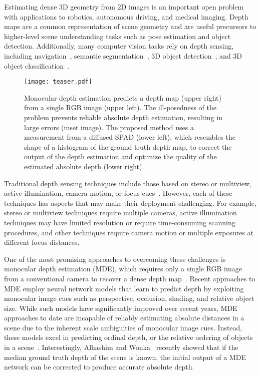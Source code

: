 Estimating dense 3D geometry from 2D images is an important open problem with applications to robotics, autonomous driving, and medical imaging. Depth maps are a common representation of scene geometry and are useful precursors to higher-level scene understanding tasks such as pose estimation and object detection. Additionally, many computer vision tasks rely on depth sensing, including navigation~\cite{geiger2013vision}, semantic segmentation~\cite{gupta2013perceptual,ren2012rgb,silberman2012indoor}, 3D object detection~\cite{gupta2014learning,lin2013holistic,shrivastava2013building,song2014sliding,song2016deep}, and 3D object classification~\cite{maturana2015voxnet,qi2016volumetric,wu20153d}. 

\begin{figure}
  \texttt{[image: teaser.pdf]}
  \caption{Monocular depth estimation predicts a depth map (upper right) from a
    single RGB image (upper left). The ill-posedness of the problem prevents
    reliable absolute depth estimation, resulting in large errors (inset image).
    The proposed method uses a measurement from a diffused SPAD (lower left),
    which resembles the shape of a histogram of the ground truth depth map, to
    correct the output of the depth estimation and optimize the quality of the
    estimated absolute depth (lower right).}
  \label{fig:teaser}
\end{figure}

Traditional depth sensing techniques include those based on stereo or multiview, active illumination, camera motion, or focus cues~\cite{szeliski2010computer}. However, each of these techniques has aspects that may make their deployment challenging. For example, stereo or multiview techniques require multiple cameras, active illumination techniques may have limited resolution or require time-consuming scanning procedures, and other techniques require camera motion or multiple exposures at different focus distances.

One of the most promising approaches to overcoming these challenges is monocular depth estimation (MDE), which requires only a single RGB image from a conventional camera to recover a dense depth map~\cite{Alhashim2018,Eigen2014,Fu2018,Laina2016,Saxena2006}. Recent approaches to MDE employ neural network models that learn to predict depth by exploiting monocular image cues such as perspective, occlusion, shading, and relative object size. While such models have significantly improved over recent years, MDE approaches to date are incapable of reliably estimating absolute distances in a scene due to the inherent scale ambiguities of monocular image cues. Instead, these models excel in predicting ordinal depth, or the relative ordering of objects in a scene~\cite{Eigen2014,Fu2018}. Interestingly, Alhashim and Wonka~\cite{Alhashim2018} recently showed that if the median ground truth depth of the scene is known, the initial output of a MDE network can be corrected to produce accurate absolute depth.

